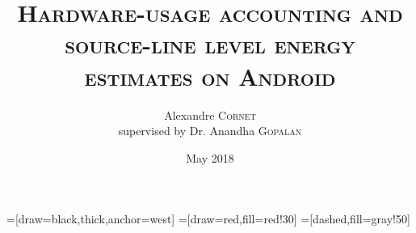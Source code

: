 
\title[Project presentation]{\textsc{Hardware-usage accounting and source-line level energy estimates on Android}}
\author{Alexandre \textsc{Cornet}\\ {\footnotesize supervised by Dr. Anandha \textsc{Gopalan}}}
\date{May 2018}

=[draw=black,thick,anchor=west]
=[draw=red,fill=red!30]
=[dashed,fill=gray!50]
\begin{frame}
\titlepage
\end{frame}
%

%
%
